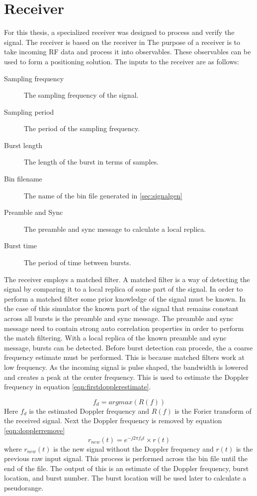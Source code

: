 \documentclass[12pt]{report}
\begin{document}
\section{Receiver}\label{sec:receiver}
For this thesis, a specialized receiver was designed to process and verify the signal. The receiver is based on the receiver in \cite{samuel_mcdougal_single-antenna_2022} The purpose of a receiver is to take incoming RF data and process it into observables. These observables can be used to form a positioning solution. The inputs to the receiver are as follows:
\begin{description}
    \item[Sampling frequency] The sampling frequency of the signal. 
    \item[Sampling period] The period of the sampling frequency.
    \item[Burst length] The length of the burst in terms of samples.
    \item[Bin filename] The name of the bin file generated in \ref{sec:signalgen}
    \item[Preamble and Sync] The preamble and sync message to calculate a local replica.
    \item[Burst time] The period of time between bursts.  
\end{description}

The receiver employs a matched filter. A matched filter is a way of detecting the signal by comparing it to a local replica of some part of the signal. In order to perform a matched filter some prior knowledge of the signal must be known. In the case of this simulator the known part of the signal that remains constant across all bursts is the preamble and sync message. The preamble and sync message need to contain strong auto correlation properties in order to perform the match filtering. With a local replica of the known preamble and sync message, bursts can be detected. Before burst detection can procede, the a coarse frequency estimate must be performed. This is because matched filters work at low frequency. As the incoming signal is pulse shaped, the bandwidth is lowered and creates a peak at the center frequency. This is used to estimate the Doppler frequency in equation \ref{eqn:firstdopplerestimate}.

\begin{equation}
    f_d = argmax(R(f))
    \label{eqn:firstdopplerestimate}
\end{equation}
Here $f_d$ is the estimated Doppler frequency and $R(f)$ is the Forier transform of the received signal. Next the Doppler frequency is removed by equation \ref{eqn:dopplerremove}
\begin{equation}
    r_{new}(t) = e^{-j2\pi f_d t} \times r(t)
    \label{eqn:dopplerremove}
\end{equation}
where $r_{new}(t)$ is the new signal without the Doppler frequency and $r(t)$ is the previous raw input signal. This process is performed across the bin file until the end of the file. The output of this is an estimate of the Doppler frequency, burst location, and burst number. The burst location will be used later to calculate a pseudorange. 
\end{document}
